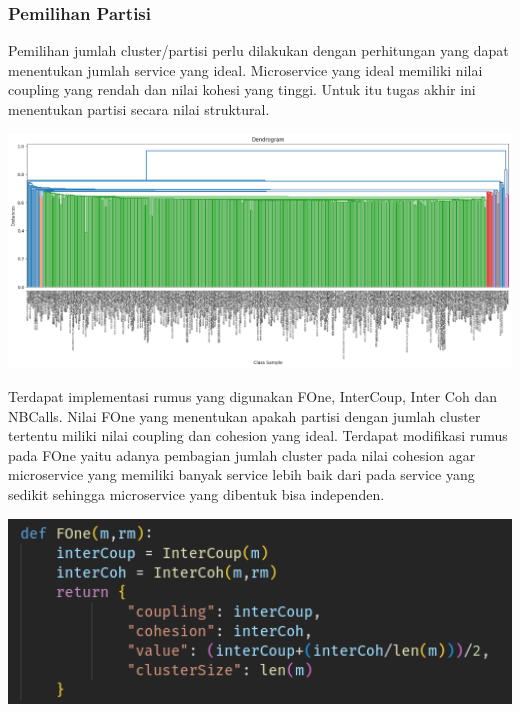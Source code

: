 \subsubsection{Pemilihan Partisi}
Pemilihan jumlah cluster/partisi perlu dilakukan dengan perhitungan yang dapat menentukan jumlah service yang ideal. Microservice yang ideal memiliki nilai coupling yang rendah dan nilai kohesi yang tinggi. Untuk itu tugas akhir ini menentukan partisi secara nilai struktural. 
\begin{center}
	\includegraphics[width=14cm]{img/bab_3/dendogram.png}
	\label{fig:asd}
\end{center}
Terdapat implementasi rumus yang digunakan FOne, InterCoup, Inter Coh dan NBCalls. Nilai FOne  yang menentukan apakah partisi dengan jumlah cluster tertentu miliki nilai coupling dan cohesion yang ideal. Terdapat modifikasi rumus pada FOne yaitu adanya pembagian jumlah cluster pada nilai cohesion agar microservice yang memiliki banyak service lebih baik dari pada service yang sedikit sehingga  microservice yang dibentuk bisa independen. 
\begin{center}
	\includegraphics[width=14cm]{img/bab_3/FOne.png}
	\label{fig:asd}
\end{center}

